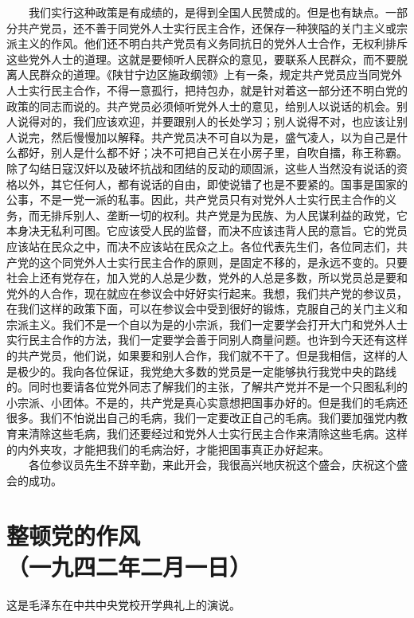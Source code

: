 \documentclass[cn,11pt,chinese]{elegantbook}
\def\myformat#1{\hfil\hfil #1}
\begin{document}
　　我们实行这种政策是有成绩的，是得到全国人民赞成的。但是也有缺点。一部分共产党员，还不善于同党外人士实行民主合作，还保存一种狭隘的关门主义或宗派主义的作风。他们还不明白共产党员有义务同抗日的党外人士合作，无权利排斥这些党外人士的道理。这就是要倾听人民群众的意见，要联系人民群众，而不要脱离人民群众的道理。《陕甘宁边区施政纲领》上有一条，规定共产党员应当同党外人士实行民主合作，不得一意孤行，把持包办，就是针对着这一部分还不明白党的政策的同志而说的。共产党员必须倾听党外人士的意见，给别人以说话的机会。别人说得对的，我们应该欢迎，并要跟别人的长处学习；别人说得不对，也应该让别人说完，然后慢慢加以解释。共产党员决不可自以为是，盛气凌人，以为自己是什么都好，别人是什么都不好；决不可把自己关在小房子里，自吹自擂，称王称霸。除了勾结日寇汉奸以及破坏抗战和团结的反动的顽固派，这些人当然没有说话的资格以外，其它任何人，都有说话的自由，即使说错了也是不要紧的。国事是国家的公事，不是一党一派的私事。因此，共产党员只有对党外人士实行民主合作的义务，而无排斥别人、垄断一切的权利。共产党是为民族、为人民谋利益的政党，它本身决无私利可图。它应该受人民的监督，而决不应该违背人民的意旨。它的党员应该站在民众之中，而决不应该站在民众之上。各位代表先生们，各位同志们，共产党的这个同党外人士实行民主合作的原则，是固定不移的，是永远不变的。只要社会上还有党存在，加入党的人总是少数，党外的人总是多数，所以党员总是要和党外的人合作，现在就应在参议会中好好实行起来。我想，我们共产党的参议员，在我们这样的政策下面，可以在参议会中受到很好的锻炼，克服自己的关门主义和宗派主义。我们不是一个自以为是的小宗派，我们一定要学会打开大门和党外人士实行民主合作的方法，我们一定要学会善于同别人商量问题。也许到今天还有这样的共产党员，他们说，如果要和别人合作，我们就不干了。但是我相信，这样的人是极少的。我向各位保证，我党绝大多数的党员是一定能够执行我党中央的路线的。同时也要请各位党外同志了解我们的主张，了解共产党并不是一个只图私利的小宗派、小团体。不是的，共产党是真心实意想把国事办好的。但是我们的毛病还很多。我们不怕说出自己的毛病，我们一定要改正自己的毛病。我们要加强党内教育来清除这些毛病，我们还要经过和党外人士实行民主合作来清除这些毛病。这样的内外夹攻，才能把我们的毛病治好，才能把国事真正办好起来。\\
　　各位参议员先生不辞辛勤，来此开会，我很高兴地庆祝这个盛会，庆祝这个盛会的成功。\\
\newpage\section*{\myformat{整顿党的作风}\\\myformat{（一九四二年二月一日）}}
\begin{introduction}\item 这是毛泽东在中共中央党校开学典礼上的演说。\end{introduction}
\end{document}
